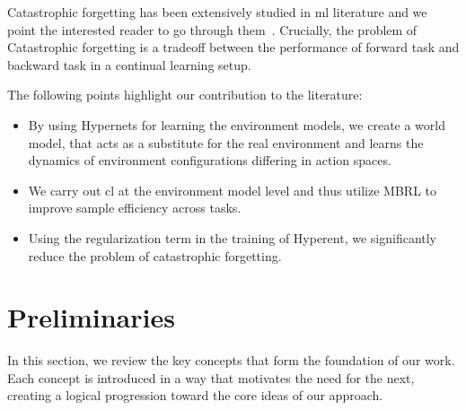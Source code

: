 \documentclass{article}
\begin{document}
Catastrophic forgetting has been extensively studied in \gls{ml} literature and we point the interested reader to go through them~\cite{Fernando}. 
Crucially, the problem of Catastrophic forgetting is a tradeoff between the performance of forward task and backward task in a continual learning setup. 


The following points highlight our contribution to the literature:

\begin{itemize}

    \item By using Hypernets for learning the environment models, we create a world model, that acts as a substitute for the real environment and learns the dynamics of environment configurations differing in action spaces.

    \item We carry out \gls{cl} at the environment model level and thus utilize MBRL to improve sample efficiency across tasks.
        
    \item Using the regularization term in the training of Hyperent, we significantly reduce the problem of catastrophic forgetting.
\end{itemize}


\section{Preliminaries}

In this section, we review the key concepts that form the foundation of our work. Each concept is introduced in a way that motivates the need for the next, creating a logical progression toward the core ideas of our approach.
\end{document}
